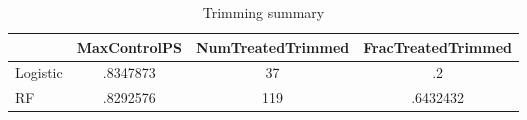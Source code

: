 \begin{table}[htbp]\centering
\caption{Trimming summary}
\begin{tabular}{l*{3}{c}}
\hline\hline
            &MaxControlPS&NumTreatedTrimmed&FracTreatedTrimmed\\
\hline
Logistic    &    .8347873&          37&          .2\\
RF          &    .8292576&         119&    .6432432\\
\hline\hline
\end{tabular}
\end{table}
